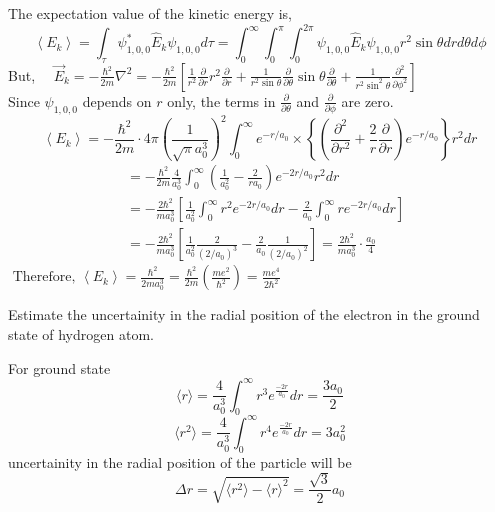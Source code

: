 \begin{answer}
	The expectation value of the kinetic energy is,
	$$
	\left\langle E_{k}\right\rangle=\int_{\tau} \psi_{1,0,0}^{*} \hat{E}_{k} \psi_{1,0,0} d \tau=\int_{0}^{\infty} \int_{0}^{\pi} \int_{0}^{2 \pi} \psi_{1,0,0} \hat{E}_{k} \psi_{1,0,0} r^{2} \sin \theta d r d \theta d \phi
	$$
	But, $\quad \vec{E}_{k}=-\frac{\hbar^{2}}{2 m} \nabla^{2}=-\frac{\hbar^{2}}{2 m}\left[\frac{1}{r^{2}} \frac{\partial}{\partial r} r^{2} \frac{\partial}{\partial r}+\frac{1}{r^{2} \sin \theta} \frac{\partial}{\partial \theta} \sin \theta \frac{\partial}{\partial \theta}+\frac{1}{r^{2} \sin ^{2} \theta} \frac{\partial^{2}}{\partial \phi^{2}}\right]$\\
	Since $\psi_{1,0,0}$ depends on $r$ only, the terms in $\frac{\partial}{\partial \theta}$ and $\frac{\partial}{\partial \phi}$ are zero.\\
	$$\left\langle E_{k}\right\rangle=-\frac{\hbar^{2}}{2 m} \cdot 4 \pi\left(\frac{1}{\sqrt{\pi} a_{0}^{3}}\right)^{2} \int_{0}^{\infty} e^{-r / a_{0}} \times\left\{\left(\frac{\partial^{2}}{\partial r^{2}}+\frac{2}{r} \frac{\partial}{\partial r}\right) e^{-r / a_{0}}\right\} r^{2} d r$$
	$$\begin{aligned}
		&=-\frac{\hbar^{2}}{2 m} \frac{4}{a_{0}^{3}} \int_{0}^{\infty}\left(\frac{1}{a_{0}^{2}}-\frac{2}{r a_{0}}\right) e^{-2 r / a_{0}} r^{2} d r \\
		&=-\frac{2 \hbar^{2}}{m a_{0}^{3}}\left[\frac{1}{a_{0}^{2}} \int_{0}^{\infty} r^{2} e^{-2 r / a_{0}} d r-\frac{2}{a_{0}} \int_{0}^{\infty} r e^{-2 r / a_{0}} d r\right] \\
		&=-\frac{2 \hbar^{2}}{m a_{0}^{3}}\left[\frac{1}{a_{0}^{2}} \frac{2}{\left(2 / a_{0}\right)^{3}}-\frac{2}{a_{0}} \frac{1}{\left(2 / a_{0}\right)^{2}}\right]=\frac{2 \hbar^{2}}{m a_{0}^{3}} \cdot \frac{a_{0}}{4}
	\end{aligned}$$
	$\text { Therefore, }\left\langle E_{k}\right\rangle=\frac{\hbar^{2}}{2 m a_{0}^{3}}=\frac{\hbar^{2}}{2 m}\left(\frac{m e^{2}}{\hbar^{2}}\right)=\frac{m e^{4}}{2 \hbar^{2}}$
\end{answer}
\begin{exercise}
 Estimate the uncertainity in the radial position of the electron in the ground state of hydrogen atom.
\end{exercise}
\begin{answer}
For ground state\\
$$\langle r \rangle =\frac{4}{a_0^3}	\int_{0}^{\infty} r^3 e^{\frac{-2r}{a_0}}dr=\frac{3a_0}{2}$$
$$\langle r^2 \rangle =\frac{4}{a_0^3}	\int_{0}^{\infty} r^4 e^{\frac{-2r}{a_0}}dr=3a_0^2$$
uncertainity in the radial position of the particle will be \\
$$\Delta r=\sqrt{\langle r^2 \rangle-\langle r \rangle^2}=\frac{\sqrt{3}}{2}a_0$$
\end{answer}
